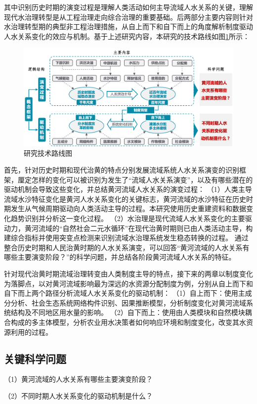 其中识别历史时期的演变过程是理解人类活动如何主导流域人\textendash{}水关系的关键，理解现代水治理转型是从工程治理走向综合治理的重要基础。后两部分主要内容则针对水治理转型期的典型非工程治理措施，从自上而下和自下而上的角度解析制度驱动人\textendash{}水关系变化的效应与机制。基于上述研究内容，本研究的技术路线如图\ref{ch1:fig:workflow}所示：

\begin{figure}[!ht] %
    \includegraphics[width=\textwidth]{img/ch1/ch1_workflow.png}
    \caption{研究技术路线图}\label{ch1:fig:workflow}
\end{figure}

首先，针对历史时期和现代治黄的特点分别发展流域系统人\textendash{}水关系演变的识别框架，厘定怎样的变化可以被识别为发生了“流域人\textendash{}水关系演变”，以及有哪些潜在的驱动机制会导致这些变化，并总结黄河流域人\textendash{}水关系的演变过程：
（1）人类主导流域水沙特征变化是黄河人\textendash{}水关系变化的关键标志，黄河流域的水沙特征在历史时期发生从气候周期驱动向人类活动主导的过程。本研究使用历史重建资料和数据变化趋势识别并分析这一变化过程。
（2）水治理是现代流域人\textendash{}水关系变化的主要驱动力，黄河流域的“自然\textendash{}社会二元水循环”在现代治黄时期则已由人类活动主导，构建综合指标并使用突变点检测来识别流域水治理系统发生稳态转换的过程。
通过整合历史时期和人民治黄时期的人\textendash{}水关系演变，可以回答“黄河流域的人\textendash{}水关系有哪些主要演变阶段？”的科学问题，并总结各阶段黄河流域人\textendash{}水关系的特征。

针对现代治黄时期流域治理转变由人类制度主导的特点，接下来的两章以制度变化为落脚点，以对黄河流域影响最为深远的水资源分配制度为例，分别从自上而下和自下而上两个路径分析流域人\textendash{}水关系变化的驱动机制：
（1）自上而下：使用主成分分析、社会\textendash{}生态系统网络构件识别、因果推断模型，分析制度变化对黄河流域系统结构及不同地区用水量的影响。
（2）自下而上：使用由人类模块和自然模块耦合构成的多主体模型，分析农业用水决策者如何响应环境和制度变化，改变其水资源利用的过程。

\subsection{关键科学问题}

（1）黄河流域的人\textendash{}水关系有哪些主要演变阶段？

（2）不同时期人\textendash{}水关系变化的驱动机制是什么？
